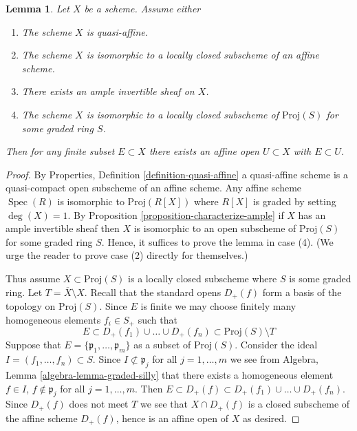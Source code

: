 \documentclass[10pt,a4paper]{amsart}
\theoremstyle{plain}
\newtheorem{lemma}[subsection]{Lemma}
\theoremstyle{definition}
\theoremstyle{remark}
\numberwithin{equation}{subsection}
\def\Spec{\mathop{\mathrm{Spec}}}
\begin{document}
\begin{lemma}
\label{lemma-ample-finite-set-in-affine}
Let $X$ be a scheme. Assume either
\begin{enumerate}
\item The scheme $X$ is quasi-affine.
\item The scheme $X$ is isomorphic to a locally closed subscheme
of an affine scheme.
\item There exists an ample invertible sheaf on $X$.
\item The scheme $X$ is isomorphic to a locally closed subscheme
of $\text{Proj}(S)$ for some graded ring $S$.
\end{enumerate}
Then for any finite subset $E \subset X$ there exists an
affine open $U \subset X$ with $E \subset U$.
\end{lemma}

\begin{proof}
By Properties, Definition \ref{definition-quasi-affine}
a quasi-affine scheme is a quasi-compact open subscheme
of an affine scheme. Any affine scheme $\Spec(R)$ is isomorphic to
$\text{Proj}(R[X])$ where $R[X]$ is graded by setting $\deg(X) = 1$.
By Proposition \ref{proposition-characterize-ample}
if $X$ has an ample invertible sheaf then $X$ is isomorphic to an open
subscheme of $\text{Proj}(S)$ for some graded ring $S$.
Hence, it suffices to prove the lemma in case (4).
(We urge the reader to prove case (2) directly for themselves.)

\medskip\noindent
Thus assume $X \subset \text{Proj}(S)$ is a locally closed subscheme
where $S$ is some graded ring. Let $T = \overline{X} \setminus X$.
Recall that the standard opens $D_{+}(f)$ form a basis of the
topology on $\text{Proj}(S)$. Since $E$ is finite we may choose finitely many
homogeneous elements $f_i \in S_{+}$ such that
$$
E \subset
D_{+}(f_1) \cup \ldots \cup D_{+}(f_n) \subset
\text{Proj}(S) \setminus T
$$
Suppose that $E = \{\mathfrak p_1, \ldots, \mathfrak p_m\}$
as a subset of $\text{Proj}(S)$.
Consider the ideal $I = (f_1, \ldots, f_n) \subset S$.
Since $I \not \subset \mathfrak p_j$ for all $j = 1, \ldots, m$
we see from Algebra, Lemma \ref{algebra-lemma-graded-silly} that
there exists a homogeneous element $f \in I$, $f \not \in \mathfrak p_j$
for all $j = 1, \ldots, m$. Then $E \subset D_{+}(f) \subset
D_{+}(f_1) \cup \ldots \cup D_{+}(f_n)$. Since $D_{+}(f)$ does not
meet $T$ we see that $X \cap D_{+}(f)$ is a closed subscheme of the
affine scheme $D_{+}(f)$, hence is an affine open of $X$ as desired.
\end{proof}
\end{document}
